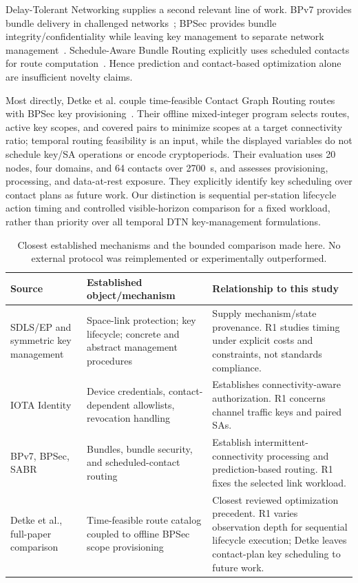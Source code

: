 \documentclass[conference]{IEEEtran}
\begin{document}
Delay-Tolerant Networking supplies a second relevant line of work. BPv7 provides bundle delivery in challenged networks~\cite{bp}; BPSec provides bundle integrity/confidentiality while leaving key management to separate network management~\cite{bpsec}. Schedule-Aware Bundle Routing explicitly uses scheduled contacts for route computation~\cite{sabr}. Hence prediction and contact-based optimization alone are insufficient novelty claims.

Most directly, Detke et al. couple time-feasible Contact Graph Routing routes with BPSec key provisioning~\cite{detke}. Their offline mixed-integer program selects routes, active key scopes, and covered pairs to minimize scopes at a target connectivity ratio; temporal routing feasibility is an input, while the displayed variables do not schedule key/SA operations or encode cryptoperiods. Their evaluation uses 20 nodes, four domains, and 64 contacts over 2700~s, and assesses provisioning, processing, and data-at-rest exposure. They explicitly identify key scheduling over contact plans as future work. Our distinction is sequential per-station lifecycle action timing and controlled visible-horizon comparison for a fixed workload, rather than priority over all temporal DTN key-management formulations.

\begin{table}[t]
\centering\small
\caption{Closest established mechanisms and the bounded comparison made here. No external protocol was reimplemented or experimentally outperformed.}
\label{tab:related}
\begin{tabular}{p{}p{}p{}}
\toprule
Source & Established object/mechanism & Relationship to this study \\
\midrule
SDLS/EP and symmetric key management & Space-link protection; key lifecycle; concrete and abstract management procedures & Supply mechanism/state provenance. R1 studies timing under explicit costs and constraints, not standards compliance. \\
IOTA Identity & Device credentials, contact-dependent allowlists, revocation handling & Establishes connectivity-aware authorization. R1 concerns channel traffic keys and paired SAs. \\
BPv7, BPSec, SABR & Bundles, bundle security, and scheduled-contact routing & Establish intermittent-connectivity processing and prediction-based routing. R1 fixes the selected link workload. \\
Detke et al., full-paper comparison & Time-feasible route catalog coupled to offline BPSec scope provisioning & Closest reviewed optimization precedent. R1 varies observation depth for sequential lifecycle execution; Detke leaves contact-plan key scheduling to future work. \\
\bottomrule
\end{tabular}
\end{table}
\end{document}
